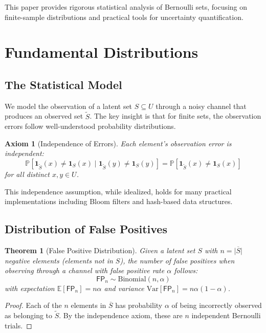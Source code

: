 \documentclass[11pt,final,hidelinks]{article}
\newtheorem{theorem}{Theorem}[section]
\newtheorem{axiom}{Axiom}
\newcommand{\obs}[1]{\widetilde{#1}}  %
\newcommand{\SetIndicator}[1]{\mathbf{1}_{#1}}
\newcommand{\SetComplement}[1]{\overline{#1}}
\newcommand{\Card}[1]{\lvert#1\rvert}
\newcommand{\Prob}[1]{\mathbb{P}\left[#1\right]}
\newcommand{\ProbCond}[2]{\mathbb{P}\left[#1 \mid #2\right]}
\newcommand{\Expect}[1]{\mathbb{E}\left[#1\right]}
\newcommand{\Var}[1]{\mathrm{Var}\left[#1\right]}
\newcommand{\FP}{\mathsf{FP}}  %
\newcommand{\fprate}{\alpha}
\newcommand{\Binomial}[2]{\mathrm{Binomial}(#1, #2)}
\begin{document}
This paper provides rigorous statistical analysis of Bernoulli sets, focusing on finite-sample distributions and practical tools for uncertainty quantification.

\section{Fundamental Distributions}

\subsection{The Statistical Model}

We model the observation of a latent set $S \subseteq U$ through a noisy channel that produces an observed set $\obs{S}$. The key insight is that for finite sets, the observation errors follow well-understood probability distributions.

\begin{axiom}[Independence of Errors]
Each element's observation error is independent:
\begin{equation}
\ProbCond{\SetIndicator{\obs{S}}(x) \neq \SetIndicator{S}(x)}{\SetIndicator{\obs{S}}(y) \neq \SetIndicator{S}(y)} = 
\Prob{\SetIndicator{\obs{S}}(x) \neq \SetIndicator{S}(x)}
\end{equation}
for all distinct $x, y \in U$.
\end{axiom}

This independence assumption, while idealized, holds for many practical implementations including Bloom filters and hash-based data structures.

\subsection{Distribution of False Positives}

\begin{theorem}[False Positive Distribution]
\label{thm:fp-dist}
Given a latent set $S$ with $n = \Card{\SetComplement{S}}$ negative elements (elements not in $S$), the number of false positives when observing through a channel with false positive rate $\fprate$ follows:
\begin{equation}
\FP_n \sim \Binomial{n}{\fprate}
\end{equation}
with expectation $\Expect{\FP_n} = n\fprate$ and variance $\Var{\FP_n} = n\fprate(1-\fprate)$.
\end{theorem}

\begin{proof}
Each of the $n$ elements in $\SetComplement{S}$ has probability $\fprate$ of being incorrectly observed as belonging to $\obs{S}$. By the independence axiom, these are $n$ independent Bernoulli trials.
\end{proof}
\end{document}
